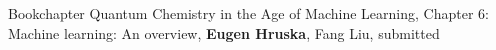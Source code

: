 \begin{rubric}{Bookchapter}
\entry*[\hspace{1.05cm}2021] Quantum Chemistry in the Age of Machine Learning, Chapter 6: Machine learning: An overview, \textbf{Eugen Hruska}, Fang Liu, submitted
\end{rubric}